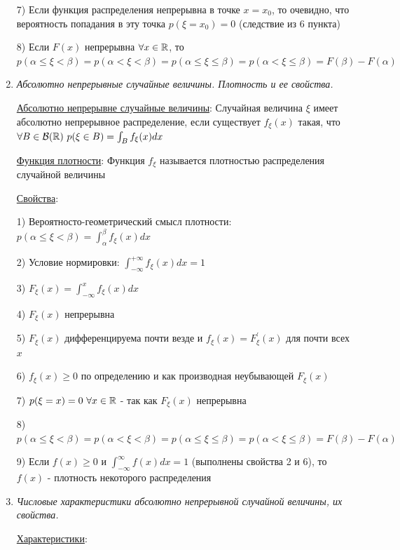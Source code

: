 \documentclass[12pt]{article}
\begin{document}
\begin{enumerate}
    7) Если функция распределения непрерывна в точке $x = x_0$, то очевидно, что вероятность попадания в эту точка $p(\xi = x_0) = 0$ (следствие из 6 пункта)
    
    8) Если $F(x)$ непрерывна $\forall x \in \mathbb{R}$, то $p(\alpha \leq \xi < \beta) = p(\alpha < \xi < \beta) = p(\alpha \leq \xi \leq \beta) = p(\alpha < \xi \leq \beta) = F(\beta) - F(\alpha)$
    
    \item \textit{Абсолютно непрерывные случайные величины. Плотность и ее свойства.}

    \hyperlink{continuousdistributionproperties}{Абсолютно непрерывне случайные величины}: Случайная величина $\xi$ имеет абсолютно непрерывное распределение, если существует $f_\xi(x)$ такая, что $\forall B \in \mathcal{B}(\mathbb{R})
    \ p(\xi \in B) = \int_B f_\xi(x)dx$

    \hyperlink{densityfunctiondefinition}{Функция плотности}: Функция $f_\xi$ называется плотностью распределения случайной величины

    \hyperlink{densityfunctionproperties}{Свойства}:

    1) Вероятносто-геометрический смысл плотности: $p(\alpha \leq \xi < \beta) = \int_{\alpha}^\beta f_\xi(x) dx$

    2) Условие нормировки: $\int_{-\infty}^{+\infty} f_\xi(x)dx = 1$

    3) $F_\xi(x) = \int_{-\infty}^x f_\xi(x)dx$

    4) $F_\xi(x)$ непрерывна 

    5) $F_\xi(x)$ дифференцируема почти везде и $f_\xi(x) = F^\prime_\xi(x)$ для почти всех $x$

    6) $f_\xi(x) \geq 0$ по определению и как производная неубывающей $F_\xi(x)$

    7) $p(\xi = x) = 0 \ \forall x \in \mathbb{R}$ - так как $F_\xi(x)$ непрерывна

    8) $p(\alpha \leq \xi < \beta) = p(\alpha < \xi < \beta) = p(\alpha \leq \xi \leq \beta) = p(\alpha < \xi \leq \beta) = F(\beta) - F(\alpha)$

    9) \Ths Если $f(x) \geq 0$ и $\int_{-\infty}^{\infty} f(x)dx = 1$ (выполнены свойства 2 и 6), то $f(x)$ - плотность некоторого распределения

    \item \textit{Числовые характеристики абсолютно непрерывной случайной величины, их свойства.}

    \hyperlink{attributesofcontinuousrandomvariable}{Характеристики}:


\end{enumerate}
\end{document}
